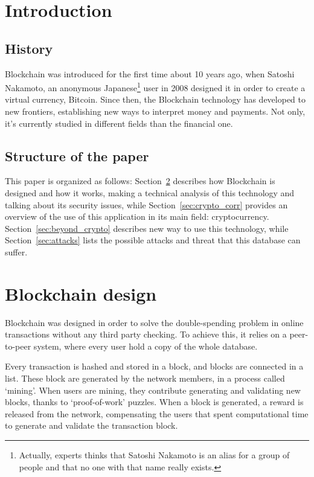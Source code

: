 \section{Introduction}

\subsection{History}
Blockchain was introduced for the first time about 10 years ago, when Satoshi
Nakamoto, an anonymous Japanese\footnote{Actually, experts thinks that Satoshi
Nakamoto is an alias for a group of people and that no one with that name
really exists.} user in 2008 designed it in order to create a virtual currency,
Bitcoin. Since then, the Blockchain technology has developed to new frontiers,
establishing new ways to interpret money and payments. Not only, it's currently
studied in different fields than the financial one.

\subsection{Structure of the paper}

This paper is organized as follows: Section~\ref{sec:block_design} describes
how Blockchain is designed and how it works, making a technical analysis of this
technology and talking about its security issues, while
Section~\ref{sec:crypto_corr} provides an overview of the
use of this application in its main field: cryptocurrency.
Section~\ref{sec:beyond_crypto} describes new way to use this technology, while
Section~\ref{sec:attacks} lists the possible attacks and threat that this
database can suffer.

\section{Blockchain design}
\label{sec:block_design}
Blockchain was designed in order to solve the double-spending problem in
online transactions without any third party checking\cite{nakamoto08}. To
achieve this, it relies on a peer-to-peer system, where every user hold a copy
of the whole database.

Every transaction is hashed and stored in a block, and blocks are connected in
a list. These block are generated by the network members, in a process called
`mining'. When users are mining, they contribute generating and validating new
blocks, thanks to `proof-of-work' puzzles. When a block is generated, a
reward is released from the network, compensating the users that spent
computational time to generate and validate the transaction block.

